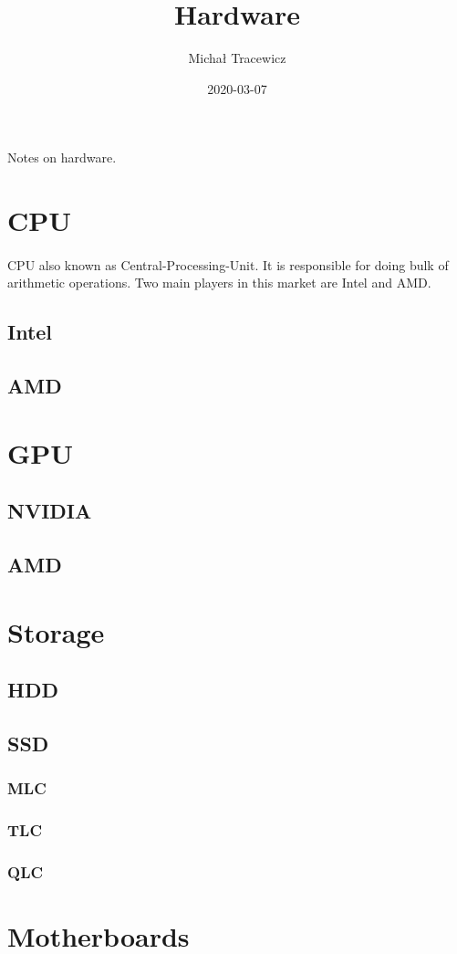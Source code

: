 \documentclass{article}
\title{Hardware}
\date{2020-03-07}
\author{Michał Tracewicz}
\begin{document}
\maketitle
\newpage
Notes on hardware.
\section{CPU}
\paragraph{}
CPU also known as Central-Processing-Unit.
It is responsible for doing bulk of arithmetic operations.
Two main players in this market are Intel and AMD.
\subsection{Intel}
\subsection{AMD}
\section{GPU}
\subsection{NVIDIA}
\subsection{AMD}
\section{Storage}
\subsection{HDD}
\subsection{SSD}
\subsubsection{MLC}
\subsubsection{TLC}
\subsubsection{QLC}
\section{Motherboards}
\end{document}
